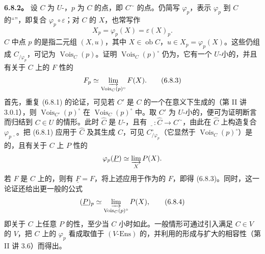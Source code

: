 \textbf{6.8.2。} 设 $C$ 为 $U$-，$p$ 为 $C$ 的点，即 $C^\sim$ 的点。仍简写 $\varphi_p$，表示 $\varphi_p$ 到 $C$ 的“”，即复合 $\varphi_p\circ\varepsilon$；对 $C$ 的 $X$，也常写作
\[X_p=\varphi_p(X)=\varepsilon(X)_p.\]
 $C$ 中点 $p$ 的是指二元组 $(X,u)$，其中 $X\in\operatorname{ob}C$，$u\in X_p=\varphi_p(X)$。这些仍组成 $C_{/\varphi_p}$，可记为 $\operatorname{Vois}_C(p)$。证明 $\operatorname{Vois}_C(p)^\circ$ 仍为，它有一个 $U$-小的，并且有关于 $C$ 上的 $F$ 性的
\[F_p\simeq\varinjlim_{\operatorname{Vois}_C(p)^\circ}F(X).\tag{6.8.3}\]
首先，重复 (6.8.1) 的论证，可见若 $C'$ 是 $C$ 的一个在意义下生成的（第 II 讲 3.0.1），则 $\operatorname{Vois}_{C'}(p)^\circ$ 在 $\operatorname{Vois}_C(p)^\circ$ 中。取 $C'$ 为 $U$-小的，便可为证明断言而归结到 $C\in U$ 的情形。此时 $\widehat C$ 是 $U$-，且有 $\underline{\phantom P}:\widehat C\to C^\sim$，由此在 $\widehat C$ 上构造复合 $\varphi_p\underline{\phantom P}$。把 (6.8.1) 应用于 $\widehat C$ 及其生成 $C$，可见 $C^\circ_{/\varphi_p}$（它显然于 $\operatorname{Vois}_C(p)^\circ$）是的，且有关于 $C$ 上 $P$ 性的
\[\varphi_p(\underline P)\simeq\varinjlim_X P(X).\]
若 $F$ 是 $C$ 上的，则有 $\underline F=F$，将上述应用于作为的 $F$，即得 (6.8.3)。同时，这一论证还给出更一般的公式
\[(\underline P)_p\simeq\varinjlim_{\operatorname{Vois}_C(p)^\circ}P(X),\tag{6.8.4}\]
即关于 $C$ 上任意 $P$ 的性，至少当 $C$ 小时如此。一般情形可通过引入满足 $C\in V$ 的 $V$，把 $C$ 上的 $\varphi_p$ 看成取值于 $(V\text{-}\mathrm{Ens})$ 的，并利用的形成与扩大的相容性（第 II 讲 3.6）而得出。

